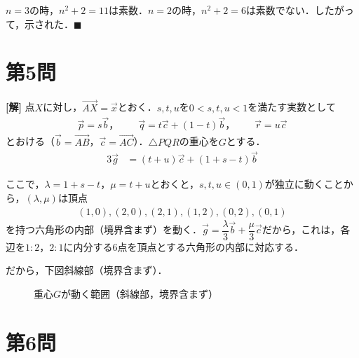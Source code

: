 \documentclass[../main.tex]{subfiles}
\begin{document}
$n=3$の時，$n^2+2=11$は素数．$n=2$の時，$n^2+2=6$は素数でない．したがって，示された．$\blacksquare$

\newpage

\section*{第5問}

{\bf [解]}
点$X$に対し，$\overrightarrow{AX}=\vec x$とおく．$s,t,u$を$0<s,t,u<1$を満たす実数として
\begin{align*}
  \vec p=s\vec b，\qquad\vec q=t\vec c+(1-t)\vec b，\qquad\vec r=u\vec c
\end{align*}
とおける（$\vec b=\overrightarrow{AB}$，$\vec c=\overrightarrow{AC}$）．$\triangle PQR$の重心を$G$とする．
\begin{align*}
  3\vec g&=(t+u)\vec c+(1+s-t)\vec b
\end{align*}

ここで，$\lambda=1+s-t$，$\mu=t+u$とおくと，$s,t,u\in(0,1)$が独立に動くことから，$(\lambda,\mu)$は頂点
\begin{align*}
  (1,0),(2,0),(2,1),(1,2),(0,2),(0,1)
\end{align*}
を持つ六角形の内部（境界含まず）を動く．$\vec g=\dfrac\lambda3\vec b+\dfrac\mu3\vec c$だから，これは，各辺を$1:2$，$2:1$に内分する6点を頂点とする六角形の内部に対応する．

だから，下図斜線部（境界含まず）．

\begin{figure}[htb]
  \centering
  \caption{重心$G$が動く範囲（斜線部，境界含まず）}
\end{figure}

\newpage

\section*{第6問}
\end{document}
